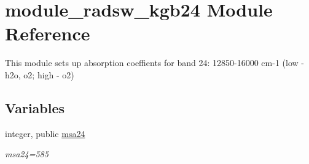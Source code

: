 \hypertarget{namespacemodule__radsw__kgb24}{}\section{module\+\_\+radsw\+\_\+kgb24 Module Reference}
\label{namespacemodule__radsw__kgb24}


This module sets up absorption coeffients for band 24\+: 12850-\/16000 cm-\/1 (low -\/ h2o, o2; high -\/ o2)  


\subsection*{Variables}
\begin{DoxyCompactItemize}
\item 
\mbox{\label{namespacemodule__radsw__kgb24_ad416df05aed8a6ae1ecd57d5c90c223c}} 
integer, public \hyperlink{namespacemodule__radsw__kgb24_ad416df05aed8a6ae1ecd57d5c90c223c}{msa24}
\begin{DoxyCompactList}\small\item\em msa24=585 \end{DoxyCompactList}\end{DoxyCompactItemize}
